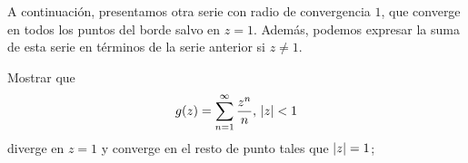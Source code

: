 
A continuación, presentamos otra serie con radio de convergencia $1$, que converge en todos los puntos del borde salvo en $z = 1$. Además, podemos expresar la suma de esta serie en términos de la serie anterior si $z \not = 1$. \\

\begin{example}
    Mostrar que
    \begin{equation*}
        g(z) = \sum_{n=1}^{\infty} \frac{z^n}{n}, \, \left\lvert z\right\rvert < 1
    \end{equation*}
    diverge en $z = 1$  y converge en el resto de punto tales que $\left\lvert z\right\rvert = 1$;

\end{example}

